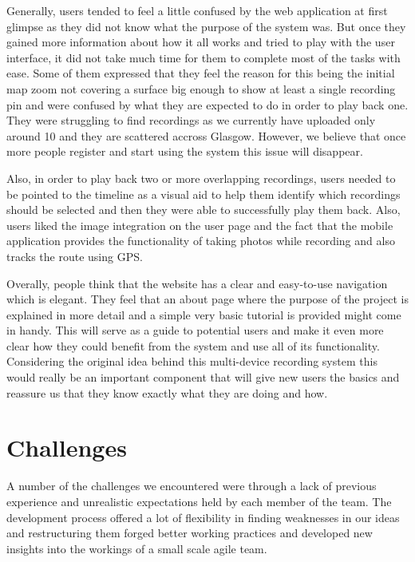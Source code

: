 \documentclass{l3proj}
\begin{document}
Generally, users tended to feel a little confused by the web application at first glimpse as they did not know what the purpose of the system was.
But once they gained more information about how it all works and tried to play with the user interface, it did not take much time for them to complete most of the tasks with ease.
Some of them expressed that they feel the reason for this being the initial map zoom not covering a surface big enough to show at least a single recording pin and were confused by what they are expected to do in order to play back one.
They were struggling to find recordings as we currently have uploaded only around 10 and they are scattered accross Glasgow.
However, we believe that once more people register and start using the system this issue will disappear.

Also, in order to play back two or more overlapping recordings, users needed to be pointed to the timeline as a visual aid to help them identify which recordings should be selected and then they were able to successfully play them back. Also, users liked the image integration on the user page and the fact that the mobile application provides the functionality of taking photos while recording and also tracks the route using GPS.

Overally, people think that the website has a clear and easy-to-use navigation which is elegant. They feel that an about page where the purpose of the project is explained in more detail and a simple very basic tutorial is provided might come in handy. This will serve as a guide to potential users and make it even more clear how they could benefit from the system and use all of its functionality. Considering the original idea behind this multi-device recording system this would really be an important component that will give new users the basics and reassure us that they know exactly what they are doing and how.

\chapter{Challenges}
\label{Challenges}

A number of the challenges we encountered were through a lack of previous
experience and unrealistic expectations held by each member of the team. The
development process offered a lot of flexibility in finding weaknesses in our
ideas and restructuring them forged better working practices and developed new
insights into the workings of a small scale agile team.
\end{document}
